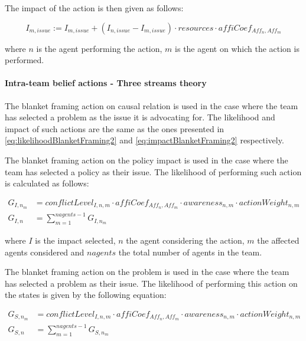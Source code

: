 The impact of the action is then given as follows:

\begin{equation}\label{eq:impactImpact2}
I_{m, issue} := I_{m, issue} + \left( I_{n, issue} - I_{m, issue} \right) \cdot resources \cdot affiCoef_{Aff_n,Aff_m}
\end{equation}

where $n$ is the agent performing the action, $m$ is the agent on which the action is performed.

\paragraph{Intra-team belief actions - Three streams theory}

The blanket framing action on causal relation is used in the case where the team has selected a problem as the issue it is advocating for. The likelihood and impact of such actions are the same as the ones presented in \autoref{eq:likelihoodBlanketFraming2} and \autoref{eq:impactBlanketFraming2} respectively.

The blanket framing action on the policy impact is used in the case where the team has selected a policy as their issue. The likelihood of performing such action is calculated as follows:

\begin{equation}\label{eq:likelihoodBlanketFraming2}\begin{split}
G_{I, n_m} &= conflictLevel_{I, n, m} \cdot affiCoef_{Aff_n,Aff_m} \cdot awareness_{n,m} \cdot actionWeight_{n,m}\\
G_{I, n} &= \sum_{m = 1}^{nagents-1} G_{I, n_m}
\end{split}\end{equation}

where $I$ is the impact selected, $n$ the agent considering the action, $m$ the affected agents considered and $nagents$ the total number of agents in the team.

The blanket framing action on the problem is used in the case where the team has selected a problem as their issue. The likelihood of performing this action on the states is given by the following equation:

\begin{equation} \begin{split}
G_{S, n_m} &=  conflictLevel_{I, n, m} \cdot affiCoef_{Aff_n,Aff_m} \cdot awareness_{n,m} \cdot actionWeight_{n,m}\\
G_{S, n} &= \sum_{m = 1}^{nagents-1} G_{S, n_m}
\end{split} \end{equation}

